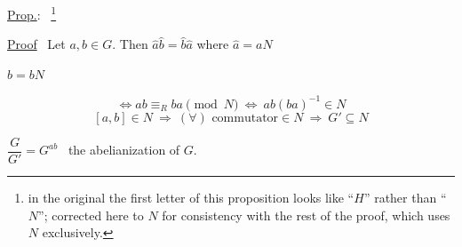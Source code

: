 \documentclass[12pt]{article}
\begin{document}
\bigskip
\noindent\underline{Prop.}: \ \footnote{in the original the first letter of this proposition looks like ``$H$'' rather than ``$N$''; corrected here to $N$ for consistency with the rest of the proof, which uses $N$ exclusively.}

\bigskip
\noindent\underline{Proof} \ Let $a,b\in G$. Then $\hat a\hat b=\hat b\hat a$ where $\hat a=aN$

\noindent $\hat b=bN$

\[
\Leftrightarrow ab\equiv_{R} ba \pmod{N} \ \Leftrightarrow \ ab(ba)^{-1}\in N
\]
\[
[a,b]\in N \ \Rightarrow \ (\forall)\text{ commutator}\in N \ \Rightarrow \ G'\subseteq N
\]

\bigskip
\noindent $\dfrac{G}{G'} = G^{ab}$ \ the abelianization of $G$.
\end{document}
